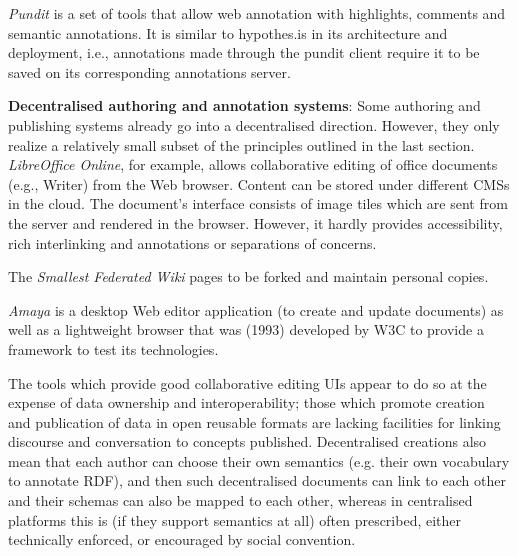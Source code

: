 \documentclass[a4paper]{llncs}
\begin{document}
                                \textit{Pundit} is a set of tools that allow web annotation with highlights, comments and semantic annotations. It is similar to hypothes.is in its architecture and deployment, i.e., annotations made through the pundit client require it to be saved on its corresponding annotations server.




                            

                            
\par 
                                \textbf{Decentralised authoring and annotation systems}:
                                Some authoring and publishing systems already go into a decentralised direction. However, they only realize a relatively small subset of the principles outlined in the last section. \textit{LibreOffice Online}, for example, allows collaborative editing of office documents (e.g., Writer) from the Web browser. Content can be stored under different CMSs in the cloud. The document’s interface consists of image tiles which are sent from the server and rendered in the browser. However, it hardly provides accessibility, rich interlinking and annotations or separations of concerns.

                                The \textit{Smallest Federated Wiki} pages to be forked and maintain personal copies.

                                

                                \textit{Amaya} is a desktop Web editor application (to create and update documents) as well as a lightweight browser that was (1993) developed by W3C to provide a framework to test its technologies.
                            

                            
\par The tools which provide good collaborative editing UIs appear to do so at the expense of data ownership and interoperability; those which promote creation and publication of data in open reusable formats are lacking facilities for linking discourse and conversation to concepts published. Decentralised creations also mean that each author can choose their own semantics (e.g. their own vocabulary to annotate RDF), and then such decentralised documents can link to each other and their schemas can also be mapped to each other, whereas in centralised platforms this is (if they support semantics at all) often prescribed, either technically enforced, or encouraged by social convention.
                        
\end{document}
